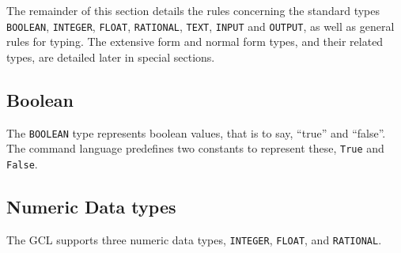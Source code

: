 The remainder of this section details the rules concerning the
standard types
{\tt BOOLEAN}, {\tt INTEGER}, {\tt FLOAT}, {\tt RATIONAL}, {\tt TEXT},
{\tt INPUT} and {\tt OUTPUT}, as well as general rules for typing.
The extensive form and normal form types, and their related types, are
detailed later in special sections.


\subsection{Boolean}

The {\tt BOOLEAN} type represents boolean values, that is to say,
``true'' and ``false''.  The command language predefines two constants
to represent these, {\tt True} and {\tt False}.

\subsection{Numeric Data types}

The GCL supports three numeric data types, \verb+INTEGER+,
\verb+FLOAT+, and \verb+RATIONAL+.

